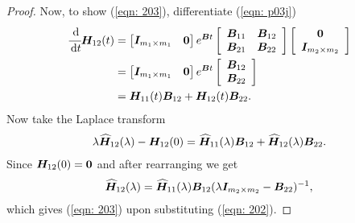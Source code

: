 \begin{proof}
	Now, to show (\ref{eqn: 203}), differentiate (\ref{eqn: p03j})
	\begin{align}
		\cfrac{\, \mathrm{d}}{\, \mathrm{d} t}\boldsymbol H_{12}(t) &= \begin{bmatrix}   \boldsymbol I_{m_1\times m_1} & \boldsymbol 0 \end{bmatrix}e^{\boldsymbol Bt} \left[\begin{array}{cc} \boldsymbol B_{11} & \boldsymbol B_{12} \\ \boldsymbol B_{21} & \boldsymbol B_{22} \end{array}\right] \left[\begin{array}{c} \boldsymbol 0 \\ \boldsymbol I_{m_2\times m_2}\end{array}\right] \nonumber
		\\&= \begin{bmatrix}   \boldsymbol I_{m_1\times m_1} & \boldsymbol 0 \end{bmatrix}e^{\boldsymbol Bt} \left[\begin{array}{c} \boldsymbol B_{12} \\ \boldsymbol B_{22} \end{array}\right] \nonumber
		\\&= \boldsymbol H_{11}(t) \boldsymbol B_{12} + \boldsymbol H_{12}(t)\boldsymbol B_{22}.
	\end{align}
	Now take the Laplace transform 
	\begin{align}
		\lambda \widehat{\boldsymbol H}_{12}(\lambda) - \boldsymbol H_{12}(0) = \widehat{\boldsymbol H}_{11}(\lambda) \boldsymbol B_{12} + \widehat{\boldsymbol H}_{12}(\lambda)\boldsymbol B_{22}.
	\end{align}
	Since \(\boldsymbol H_{12}(0)=\boldsymbol 0\) and after rearranging we get 
	\begin{align}
		\widehat{\boldsymbol H}_{12}(\lambda) = \widehat{\boldsymbol H}_{11}(\lambda) \boldsymbol B_{12} (\lambda \boldsymbol I_{m_2\times m_2} -\boldsymbol B_{22})^{-1},
	\end{align}
	which gives (\ref{eqn: 203}) upon substituting (\ref{eqn: 202}).
\end{proof}

